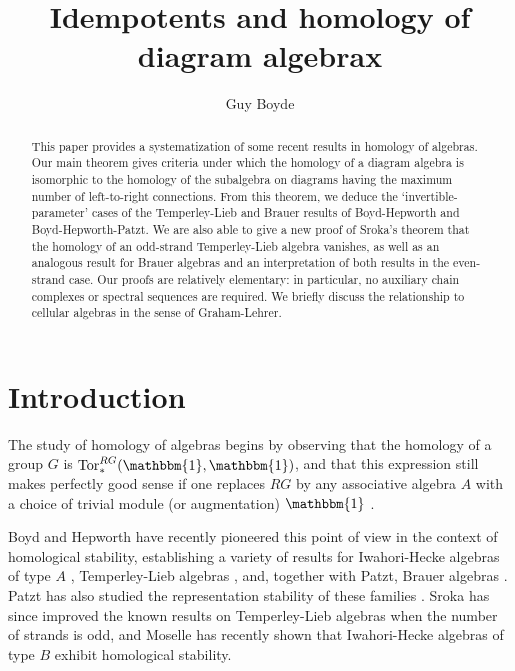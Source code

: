 \documentclass[12pt]{amsart}
\theoremstyle{plain}
\theoremstyle{definition} \newtheorem{definition}[theorem]{Definition}
\theoremstyle{plain}
\theoremstyle{plain} \newtheorem{proposition}[theorem]{Proposition}
\theoremstyle{plain} \newtheorem{conjecture}[theorem]{Conjecture}
\theoremstyle{plain} \newtheorem{corollary}[theorem]{Corollary}
\theoremstyle{remark} \newtheorem{claim}[theorem]{Claim}
\theoremstyle{remark} \newtheorem{remark}[theorem]{Remark}
\theoremstyle{remark} \newtheorem{example}[theorem]{Example}
\theoremstyle{remark} \newtheorem{comment}[theorem]{Comment}
\theoremstyle{definition} \newtheorem{question}[theorem]{Question}
\renewcommand{\t}{\mathbbm{1}}
\newcommand{\Tor}{\mathrm{Tor}}
\begin{document}
\title{Idempotents and homology of diagram algebrax}

\author{Guy Boyde}
\address{Mathematical Institute, Utrecht University, Heidelberglaan 8
3584 CS Utrecht, The Netherlands}




\begin{abstract} This paper provides a systematization of some recent results in homology of algebras. Our main theorem gives criteria under which the homology of a diagram algebra is isomorphic to the homology of the subalgebra on diagrams having the maximum number of left-to-right connections. From this theorem, we deduce the `invertible-parameter' cases of the Temperley-Lieb and Brauer results of Boyd-Hepworth and Boyd-Hepworth-Patzt. We are also able to give a new proof of Sroka's theorem that the homology of an odd-strand Temperley-Lieb algebra vanishes, as well as an analogous result for Brauer algebras and an interpretation of both results in the even-strand case. Our proofs are relatively elementary: in particular, no auxiliary chain complexes or spectral sequences are required. We briefly discuss the relationship to cellular algebras in the sense of Graham-Lehrer.
\end{abstract}

\maketitle

\section{Introduction}

The study of homology of algebras begins by observing that the homology of a group $G$ is $\Tor_*^{RG}(\t,\t)$, and that this expression still makes perfectly good sense if one replaces $RG$ by any associative algebra $A$ with a choice of trivial module (or augmentation) $\t$ \cite[Section 2.4.4]{Benson}.

Boyd and Hepworth have recently pioneered this point of view in the context of homological stability, establishing a variety of results for Iwahori-Hecke algebras of type $A$ \cite{Hepworth}, Temperley-Lieb algebras \cite{BH,BHComb}, and, together with Patzt, Brauer algebras \cite{BHP}. Patzt has also studied the representation stability of these families \cite{Patzt}. Sroka \cite{Sroka} has since improved the known results on Temperley-Lieb algebras when the number of strands is odd, and Moselle \cite{Moselle} has recently shown that Iwahori-Hecke algebras of type $B$ exhibit homological stability.
\end{document}
